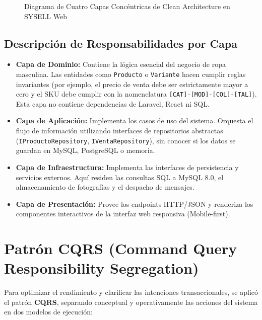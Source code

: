 \begin{figure}[H]
\caption{Diagrama de Cuatro Capas Concéntricas de Clean Architecture en SYSELL Web}
\label{fig:clean_architecture}
\end{figure}

\subsection{Descripción de Responsabilidades por Capa}
\begin{itemize}
    \item \textbf{Capa de Dominio:} Contiene la lógica esencial del negocio de ropa masculina. Las entidades como \texttt{Producto} o \texttt{Variante} hacen cumplir reglas invariantes (por ejemplo, el precio de venta debe ser estrictamente mayor a cero y el SKU debe cumplir con la nomenclatura \texttt{[CAT]-[MOD]-[COL]-[TAL]}). Esta capa no contiene dependencias de Laravel, React ni SQL.
    \item \textbf{Capa de Aplicación:} Implementa los casos de uso del sistema. Orquesta el flujo de información utilizando interfaces de repositorios abstractas (\texttt{IProductoRepository}, \texttt{IVentaRepository}), sin conocer si los datos se guardan en MySQL, PostgreSQL o memoria.
    \item \textbf{Capa de Infraestructura:} Implementa las interfaces de persistencia y servicios externos. Aquí residen las consultas SQL a MySQL 8.0, el almacenamiento de fotografías y el despacho de mensajes.
    \item \textbf{Capa de Presentación:} Provee los endpoints HTTP/JSON y renderiza los componentes interactivos de la interfaz web responsiva (Mobile-first).
\end{itemize}

\section{Patrón CQRS (Command Query Responsibility Segregation)}
Para optimizar el rendimiento y clarificar las intenciones transaccionales, se aplicó el patrón \textbf{CQRS}, separando conceptual y operativamente las acciones del sistema en dos modelos de ejecución:

